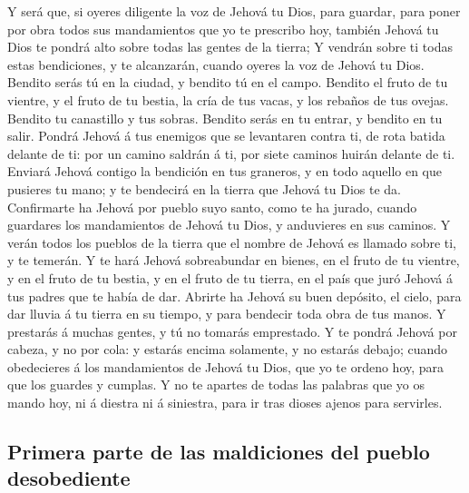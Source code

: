  Y será que, si oyeres diligente la voz de Jehová tu Dios,
para guardar, para poner por obra todos sus mandamientos que yo te
prescribo hoy, también Jehová tu Dios te pondrá alto sobre todas las
gentes de la tierra;  Y vendrán sobre ti todas estas
bendiciones, y te alcanzarán, cuando oyeres la voz de Jehová tu Dios.
 Bendito serás tú en la ciudad, y bendito tú en el campo.
 Bendito el fruto de tu vientre, y el fruto de tu bestia,
la cría de tus vacas, y los rebaños de tus ovejas. 
Bendito tu canastillo y tus sobras.  Bendito serás en tu
entrar, y bendito en tu salir.  Pondrá Jehová á tus
enemigos que se levantaren contra ti, de rota batida delante de ti: por
un camino saldrán á ti, por siete caminos huirán delante de ti.
 Enviará Jehová contigo la bendición en tus graneros, y en
todo aquello en que pusieres tu mano; y te bendecirá en la tierra que
Jehová tu Dios te da.  Confirmarte ha Jehová por pueblo
suyo santo, como te ha jurado, cuando guardares los mandamientos de
Jehová tu Dios, y anduvieres en sus caminos.  Y verán
todos los pueblos de la tierra que el nombre de Jehová es llamado sobre
ti, y te temerán.  Y te hará Jehová sobreabundar en
bienes, en el fruto de tu vientre, y en el fruto de tu bestia, y en el
fruto de tu tierra, en el país que juró Jehová á tus padres que te había
de dar.  Abrirte ha Jehová su buen depósito, el cielo,
para dar lluvia á tu tierra en su tiempo, y para bendecir toda obra de
tus manos. Y prestarás á muchas gentes, y tú no tomarás emprestado.
 Y te pondrá Jehová por cabeza, y no por cola: y estarás
encima solamente, y no estarás debajo; cuando obedecieres á los
mandamientos de Jehová tu Dios, que yo te ordeno hoy, para que los
guardes y cumplas.  Y no te apartes de todas las palabras
que yo os mando hoy, ni á diestra ni á siniestra, para ir tras dioses
ajenos para servirles.

\hypertarget{primera-parte-de-las-maldiciones-del-pueblo-desobediente}{%
\subsection{Primera parte de las maldiciones del pueblo
desobediente}\label{primera-parte-de-las-maldiciones-del-pueblo-desobediente}}

